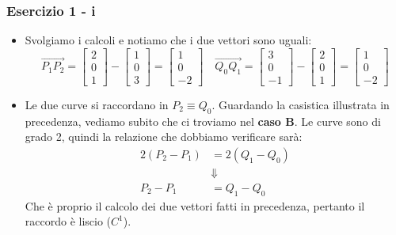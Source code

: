 \documentclass{beamer}
\begin{document}
\begin{frame}
\frametitle{Esercizio 1 - i}
    \begin{itemize}
        \item Svolgiamo i calcoli e notiamo che i due vettori sono uguali:
    \begin{displaymath}
        \overrightarrow{P_1 P_2}
        = \begin{bmatrix} 2 \\ 0 \\ 1\end{bmatrix} - \begin{bmatrix} 1 \\ 0 \\ 3\end{bmatrix}
        = \begin{bmatrix} 1 \\ 0 \\ -2 \end{bmatrix}
            \quad
        \overrightarrow{Q_0 Q_1}
        = \begin{bmatrix} 3 \\ 0 \\ -1\end{bmatrix} - \begin{bmatrix} 2 \\ 0 \\ 1\end{bmatrix}
        = \begin{bmatrix} 1 \\ 0 \\ -2 \end{bmatrix}
    \end{displaymath}

    \item Le due curve si raccordano in $P_2 \equiv Q_0$. Guardando la casistica illustrata in precedenza, vediamo subito che
    ci troviamo nel \textbf{caso B}. Le curve sono di grado 2, quindi la relazione che dobbiamo verificare sar\`a:
    \begin{align*}
        2(P_2-P_1) &= 2(Q_1-Q_0) \\
        &\Downarrow \\
        P_2-P_1 &= Q_1-Q_0
    \end{align*}
            Che \`e proprio il calcolo dei due vettori fatti in precedenza, pertanto il raccordo \`e liscio ($C^1$).

    \end{itemize}
\end{frame}
\end{document}
